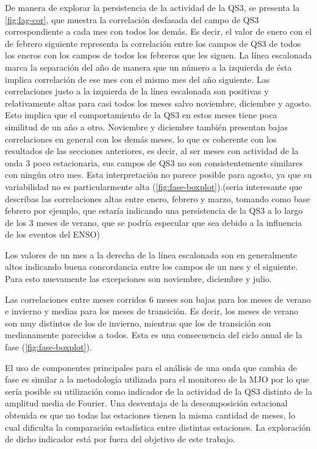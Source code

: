 \documentclass[spanish,a4paper,12pt,oneside]{book}
\begin{document}
De manera de explorar la persistencia de la actividad de la QS3, se
presenta la \autoref{fig:lag-cor}, que muestra la correlación desfasada
del campo de QS3 correspondiente a cada mes con todos los demás. Es
decir, el valor de enero con el de febrero siguiente representa la
correlación entre los campos de QS3 de todos los eneros con los campos
de todos los febreros que les siguen. La línea escalonada marca la
separación del año de manera que un número a la izquierda de ésta
implica correlación de ese mes con el mismo mes del año siguiente. Las
correlaciones justo a la izquierda de la línea escalonada son positivas
y relativamente altas para casi todos los meses salvo noviembre,
diciembre y agosto. Esto implica que el comportamiento de la QS3 en
estos meses tiene poca similitud de un año a otro. Noviembre y diciembre
también presentan bajas correlaciones en general con los demás meses, lo
que es coherente con los resultados de las secciones anteriores, es
decir, al ser meses con actividad de la onda 3 poco estacionaria, sus
campos de QS3 no son consistentemente similares con ningún otro mes.
Esta interpretación no parece posible para agosto, ya que su
variabilidad no es particularmente alta
(\autoref{fig:fase-boxplot}).(seria interesante que describas las
correlaciones altas entre enero, febrero y marzo, tomando como base
febrero por ejemplo, que estaría indicando una persistencia de la QS3 a
lo largo de los 3 meses de verano, que se podría especular que sea
debido a la influencia de los eventos del ENSO)

Los valores de un mes a la derecha de la línea escalonada son en
generalmente altos indicando buena concordancia entre los campos de un
mes y el siguiente. Para esto nuevamente las excepciones son noviembre,
diciembre y julio.

Las correlaciones entre meses corridos 6 meses son bajas para los meses
de verano e invierno y medias para los meses de transición. Es decir,
los meses de verano son muy distintos de los de invierno, mientras que
los de transición son medianamente parecidos a todos. Esta es una
consecuencia del ciclo anual de la fase (\autoref{fig:fase-boxplot}).

El uso de componentes principales para el análisis de una onda que
cambia de fase es similar a la metodología utilizada para el monitoreo
de la MJO \autocite{Wheeler2004} por lo que sería posible su utilización
como indicador de la actividad de la QS3 distinto de la amplitud media
de Fourier. Una desventaja de la descomposición estacional obtenida es
que no todas las estaciones tienen la misma cantidad de meses, lo cual
dificulta la comparación estadística entre distintas estaciones. La
exploración de dicho indicador está por fuera del objetivo de este
trabajo.
\end{document}
